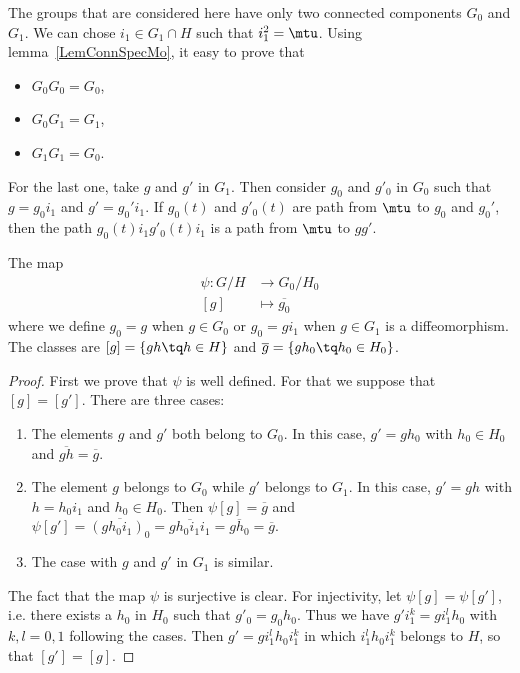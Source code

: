 The groups that are considered here have only two connected components $G_0$ and $G_1$. We can chose $i_1\in G_1\cap H$ such that $i_1^2=\mtu$. Using lemma~\ref{LemConnSpecMo}, it easy to prove that
\begin{itemize}
	\item $G_0G_0=G_0$,
	\item $G_0G_1=G_1$,
	\item $G_1G_1=G_0$.
\end{itemize}
For the last one, take $g$ and $g'$ in $G_1$. Then consider $g_0$ and $g'_0$ in $G_0$ such that $g=g_0i_1$ and $g'=g_0'i_1$. If $g_0(t)$ and $g'_0(t)$ are path from $\mtu$ to $g_0$ and $g_0'$, then the path $g_0(t)i_1g'_0(t)i_1$ is a path from $\mtu$ to $gg'$.

\begin{proposition} \label{PropGHconn}
	The map
	\begin{equation}
		\begin{aligned}
			\psi\colon G/H & \to G_0/H_0              \\
			[g]            & \mapsto \overline{ g_0 }
		\end{aligned}
	\end{equation}
	where we define $g_0=g$ when $g\in G_0$ or $g_0=gi_1$ when $g\in G_1$ is a diffeomorphism. The classes are $[g]=\{ gh\tq h\in H \}$ and $\overline{ g }=\{ gh_0\tq h_0\in H_0 \}$.
\end{proposition}

\begin{proof}
	First we prove that $\psi$ is well defined. For that we suppose that $[g]=[g']$. There are three cases:
	\begin{enumerate}
		\item The elements $g$ and $g'$ both belong to $G_0$. In this case, $g'=gh_0$ with $h_0\in H_0$ and $\overline{ gh }=\overline{ g }$.
		\item The element $g$ belongs to $G_0$ while $g'$ belongs to $G_1$. In this case, $g'=gh$ with $h=h_0i_1$ and $h_0\in H_0$. Then $\psi[g]=\overline{ g }$ and $\psi[g']= \overline{ (gh_0i_1)_0 }=\overline{ gh_0i_1i_1 }=\overline{ gh_0 }=\overline{ g } $.
		\item The case with $g$ and $g'$ in $G_1$ is similar.
	\end{enumerate}

	The fact that the map $\psi$ is surjective is clear. For injectivity, let $\psi[g]=\psi[g']$, i.e. there exists a $h_0$ in $H_0$ such that $g'_0=g_0h_0$. Thus we have $g'i_1^k=gi_1^lh_0$ with $k,l=0,1$ following the cases. Then $g'=gi_1^lh_0i_1^k$ in which $i_1^lh_0i_1^k$ belongs to $H$, so that $[g']=[g]$.

\end{proof}


